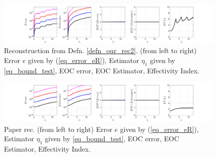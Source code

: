 \documentclass[12pt,a4paper]{article}
\numberwithin{equation}{section}
\theoremstyle{definition}
\begin{document}
\begin{figure}[H]
	\hspace{-3cm}
	\includegraphics[scale=0.55]{fig_LeapFrogplots_1x5_sin_IC_harmonic_order_2_u1_v9_rec2}	
	\caption{Reconstruction from Defn. \ref{defn_our_rec2}. (from left to right) Error $e$ given by (\ref{eq_error_eR}), Estimator $\eta_1$ given by \ref{eq_bound_test},  EOC error, EOC Estimator, Effectivity Index.}
	\label{fig_all_in_one_our_rec_2_u1_v9}
\end{figure}
\begin{figure}[H]
	\hspace{-3cm}
	\includegraphics[scale=0.55]{fig_LeapFrogplots_1x5_sin_IC_harmonic_u1_v9_paperrec}	
	\caption{Paper rec. (from left to right) Error $e$ given by (\ref{eq_error_eR}), Estimator $\eta_1$ given by \ref{eq_bound_test},  EOC error, EOC Estimator, Effectivity Index.}
	\label{fig_all_in_one_paperrec_u01_v09}
\end{figure}
\end{document}
